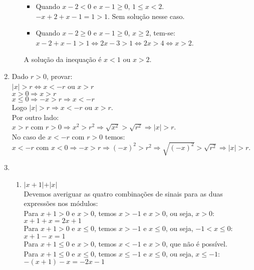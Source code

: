\begin{enumerate}
\begin{enumerate}
\begin{itemize}
		 \item
		 Quando $x - 2 < 0$ e $x -1 \geq 0$, $1 \leq x < 2$.\\
		 $-x + 2 + x -1 = 1 > 1$. Sem solução nesse caso.
		 \item
		 Quando $x - 2 \geq 0$ e $x - 1 \geq 0$, $x \geq 2$, tem-se:\\
		 $x-2+x-1>1 \Leftrightarrow 2x-3 > 1 \Leftrightarrow 2x > 4 \Leftrightarrow x > 2$.
		 \end{itemize}
 		 A solução da inequação é $x<1$ ou  $x>2$.
	\end{enumerate}
	\item 
		Dado $r > 0$, provar: \\
		$\vert x \vert > r \Leftrightarrow x < -r$ ou $x > r$\\
		$x > 0 \Rightarrow x > r$\\
		$x \leq 0 \Rightarrow -x > r \Rightarrow x < -r$\\
		Logo $\vert x \vert > r \Rightarrow x < -r$ ou $x > r$.\\
		Por outro lado:\\
		$x > r$ com $r > 0 \Rightarrow x^2 > r^2 \Rightarrow \sqrt{x^2} > \sqrt{r^2} \Rightarrow \vert x \vert > r$.\\
		No caso de $x < -r$ com $r > 0$ temos:\\
		$x < -r$ com $x < 0 \Rightarrow -x > r \Rightarrow (-x)^2 > r^2\Rightarrow \sqrt{(-x)^2} > \sqrt{r^2} \Rightarrow \vert x \vert > r$.
	\item %
		\begin{enumerate}
			\item %
			$\vert x + 1 \vert + \vert x \vert$\\
			Devemos averiguar as quatro combinações de sinais para as duas expressões nos módulos:\\
			Para $x + 1 > 0$ e $x > 0$, temos $x > -1$ e $x > 0$, ou seja, $x > 0$:\\
			$x + 1 + x = 2x + 1$\\
			Para $x + 1 > 0$ e $x \leq 0$, temos $x > -1$ e $x \leq 0$, ou seja, $-1 < x \leq 0$:\\
			$x + 1 - x = 1$\\
			Para $x + 1 \leq 0$ e $x > 0$, temos $x < -1$ e $x > 0$, que não é possível.\\
			Para $x + 1 \leq 0$ e $x \leq 0$, temos $x \leq -1$ e $x \leq 0$, ou seja, $x \leq -1$:\\		
			$-(x + 1) -x = -2x - 1$\\

\end{enumerate}
\end{enumerate}
